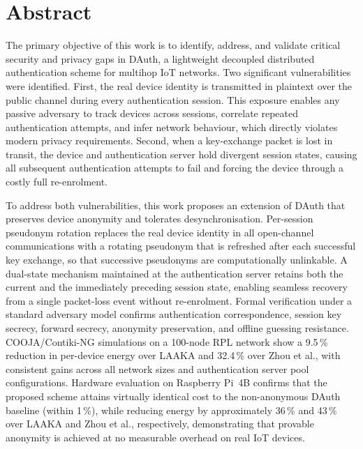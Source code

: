\chapter*{\centering Abstract}
\begin{singlespace}
\quad The primary objective of this work is to identify, address, and validate critical
security and privacy gaps in DAuth, a lightweight decoupled distributed authentication
scheme for multihop IoT networks.
Two significant vulnerabilities were identified.
First, the real device identity is transmitted in plaintext over the public
channel during every authentication session.
This exposure enables any passive adversary to track devices across sessions,
correlate repeated authentication attempts, and infer network behaviour, which
directly violates modern privacy requirements.
Second, when a key-exchange packet is lost in transit, the device and authentication
server hold divergent session states, causing all subsequent authentication attempts
to fail and forcing the device through a costly full re-enrolment.

To address both vulnerabilities, this work proposes an extension of DAuth that
preserves device anonymity and tolerates desynchronisation.
Per-session pseudonym rotation replaces the real device identity in all
open-channel communications with a rotating pseudonym that is refreshed after each
successful key exchange, so that successive pseudonyms are computationally unlinkable.
A dual-state mechanism maintained at the authentication server retains both the
current and the immediately preceding session state, enabling seamless recovery
from a single packet-loss event without re-enrolment.
Formal verification under a standard adversary model confirms authentication
correspondence, session key secrecy, forward secrecy, anonymity preservation, and
offline guessing resistance.
COOJA\slash Contiki-NG simulations on a 100-node RPL network show a 9.5\,\% reduction
in per-device energy over LAAKA and 32.4\,\% over Zhou et al., with consistent gains
across all network sizes and authentication server pool configurations.
Hardware evaluation on Raspberry Pi~4B confirms that the proposed scheme attains
virtually identical cost to the non-anonymous DAuth baseline (within 1\,\%), while
reducing energy by approximately 36\,\% and 43\,\% over LAAKA and Zhou et al.,
respectively, demonstrating that provable anonymity is achieved at no measurable
overhead on real IoT devices.
\end{singlespace}

